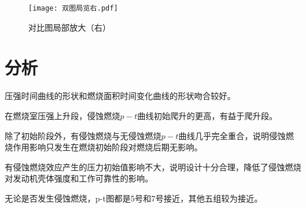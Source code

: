   \begin{figure}[!h]
    \centering
    \texttt{[image: 双图局览右.pdf]}
    \caption{对比图局部放大（右）}
    \label{fig:example}
  \end{figure}

\section{分析}
压强时间曲线的形状和燃烧面积时间变化曲线的形状吻合较好。

在燃烧室压强上升段，侵蚀燃烧$p-t$曲线初始爬升的更高，有益于爬升段。

除了初始阶段外，有侵蚀燃烧与无侵蚀燃烧$p-t$曲线几乎完全重合，说明侵蚀燃烧作用影响只发生在燃烧初始阶段对燃烧后期无影响。

有侵蚀燃烧效应产生的压力初始值影响不大，说明设计十分合理，降低了侵蚀燃烧对发动机壳体强度和工作可靠性的影响。

无论是否发生侵蚀燃烧，p-t图都是5号和7号接近，其他五组较为接近。

